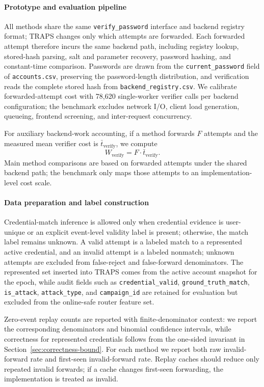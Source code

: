 \paragraph{Prototype and evaluation pipeline}
All methods share the same \texttt{verify\_password} interface and backend registry format; TRAPS changes only which attempts are forwarded. Each forwarded attempt therefore incurs the same backend path, including registry lookup, stored-hash parsing, salt and parameter recovery, password hashing, and constant-time comparison. Passwords are drawn from the \texttt{current\_password} field of \texttt{accounts.csv}, preserving the password-length distribution, and verification reads the complete stored hash from \texttt{backend\_registry.csv}. We calibrate forwarded-attempt cost with 78{,}620 single-worker verifier calls per backend configuration; the benchmark excludes network I/O, client load generation, queueing, frontend screening, and inter-request concurrency.

For auxiliary backend-work accounting, if a method forwards \(F\) attempts and the measured mean verifier cost is \(\bar{t}_{\mathrm{verify}}\), we compute
\[
W_{\mathrm{verify}} = F \cdot \bar{t}_{\mathrm{verify}} .
\]
Main method comparisons are based on forwarded attempts under the shared backend path; the benchmark only maps those attempts to an implementation-level cost scale.

\paragraph{Data preparation and label construction}
Credential-match inference is allowed only when credential evidence is user-unique or an explicit event-level validity label is present; otherwise, the match label remains unknown. A valid attempt is a labeled match to a represented active credential, and an invalid attempt is a labeled nonmatch; unknown attempts are excluded from false-reject and false-forward denominators. The represented set inserted into TRAPS comes from the active account snapshot for the epoch, while audit fields such as \texttt{credential\_valid}, \texttt{ground\_truth\_match}, \texttt{is\_attack}, \texttt{attack\_type}, and \texttt{campaign\_id} are retained for evaluation but excluded from the online-safe router feature set.

Zero-event replay counts are reported with finite-denominator context: we report the corresponding denominators and binomial confidence intervals, while correctness for represented credentials follows from the one-sided invariant in Section~\ref{sec:correctness-bound}. For each method we report both raw invalid-forward rate and first-seen invalid-forward rate. Replay caches should reduce only repeated invalid forwards; if a cache changes first-seen forwarding, the implementation is treated as invalid.

